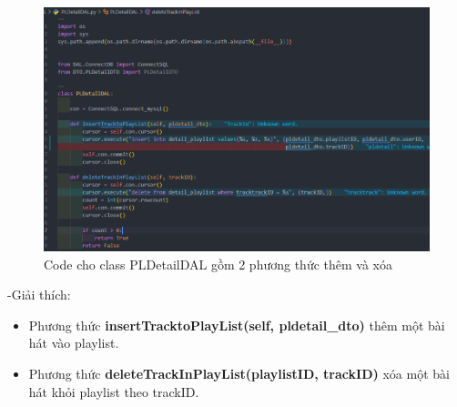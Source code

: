 \documentclass[a4paper]{article}
\begin{document}
\clearpage
\newpage
\begin{figure}[h]
	\centering
	\includegraphics[width=\textwidth]{images/PlayListDetail.png}
	\caption{Code cho class PLDetailDAL gồm 2 phương thức thêm và xóa}
\end{figure}
\begin{flushleft}
	-Giải thích:
	\begin{itemize}
		\item Phương thức \textbf{insertTracktoPlayList(self, pldetail\_dto)} thêm một bài hát vào playlist.

		\item Phương thức \textbf{deleteTrackInPlayList(playlistID, trackID)} xóa một bài hát khỏi playlist theo trackID.

	\end{itemize}
\end{flushleft}
\end{document}
